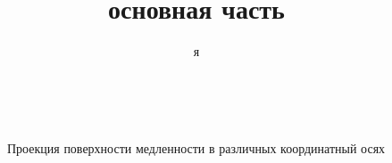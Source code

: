 \documentclass[a4paper, 12pt]{article}
\title{основная часть}
\author{я}
\begin{document}
\begin{figure}[ht!]  
\vspace{-4ex} \centering {}  
\hspace{4ex}
\hspace{4ex}  
\caption{Проекция поверхности медленности в различных координатный осях} \label{XY_axis}
\end{figure}
\end{document}

